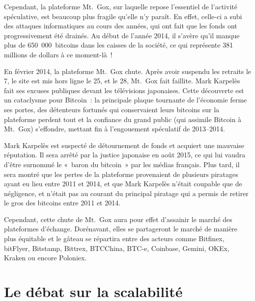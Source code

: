 Cependant, la plateforme Mt.~Gox, sur laquelle repose l'essentiel de l'activité spéculative, est beaucoup plus fragile qu'elle n'y paraît. En effet, celle-ci a subi des attaques informatiques au cours des années, qui ont fait que les fonds ont progressivement été drainés. Au début de l'année 2014, il s'avère qu'il manque plus de 650~000~bitcoins dans les caisses de la société, ce qui représente 381 millions de dollars à ce moment-là~!

En février 2014, la plateforme Mt.~Gox chute. Après avoir suspendu les retraits le 7, le site est mis hors ligne le 25, et le 28, Mt.~Gox fait faillite. Mark Karpelès fait ses excuses publiques devant les télévisions japonaises. Cette découverte est un cataclysme pour Bitcoin~: la principale plaque tournante de l'économie ferme ses portes, des détenteurs fortunés qui conservaient leurs bitcoins sur la plateforme perdent tout et la confiance du grand public (qui assimile Bitcoin à Mt.~Gox) s'effondre, mettant fin à l'engouement spéculatif de 2013--2014.

Mark Karpelès est suspecté de détournement de fonds et acquiert une mauvaise réputation. Il sera arrêté par la justice japonaise en août 2015, ce qui lui vaudra d'être surnommé le «~baron du bitcoin~» par les médias français. Plus tard, il sera montré que les pertes de la plateforme provenaient de plusieurs piratages ayant eu lieu entre 2011 et 2014, et que Mark Karpelès n'était coupable que de négligence, et n'était pas au courant du principal piratage qui a permis de retirer le gros des bitcoins entre 2011 et 2014. %

Cependant, cette chute de Mt.~Gox aura pour effet d'assainir le marché des plateformes d'échange. Dorénavant, elles se partageront le marché de manière plus équitable et le gâteau se répartira entre des acteurs comme Bitfinex, bitFlyer, Bitstamp, Bittrex, BTCChina, BTC-e, Coinbase, Gemini, OKEx, Kraken ou encore Poloniex.

\section{Le débat sur la scalabilité} %


